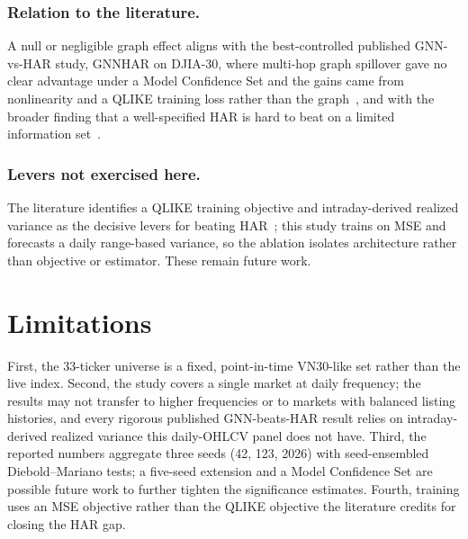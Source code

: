 \documentclass[runningheads]{llncs}
\begin{document}
\subsubsection{Relation to the literature.}
A null or negligible graph effect aligns with the best-controlled published GNN-vs-HAR study, GNNHAR on
DJIA-30, where multi-hop graph spillover gave no clear advantage under a Model Confidence Set and the gains
came from nonlinearity and a QLIKE training loss rather than the graph~\cite{zhang2025gnnhar}, and with the
broader finding that a well-specified HAR is hard to beat on a limited information set~\cite{audrino2025}.

\subsubsection{Levers not exercised here.}
The literature identifies a QLIKE training objective and intraday-derived realized variance as the decisive
levers for beating HAR~\cite{zhang2025gnnhar}; this study trains on MSE and forecasts a daily range-based
variance, so the ablation isolates architecture rather than objective or estimator. These remain future
work.

\section{Limitations}
\label{sec:limitations}
First, the 33-ticker universe is a fixed, point-in-time VN30-like set rather than the live index. Second,
the study covers a single market at daily frequency; the results may not transfer to higher frequencies or
to markets with balanced listing histories, and every rigorous published GNN-beats-HAR result relies on
intraday-derived realized variance this daily-OHLCV panel does not have. Third, the reported numbers
aggregate three seeds (42, 123, 2026) with seed-ensembled Diebold--Mariano tests; a five-seed extension and
a Model Confidence Set are possible future work to further tighten the significance estimates. Fourth,
training uses an MSE objective rather than the QLIKE objective the literature credits for closing the HAR
gap.

\end{document}
